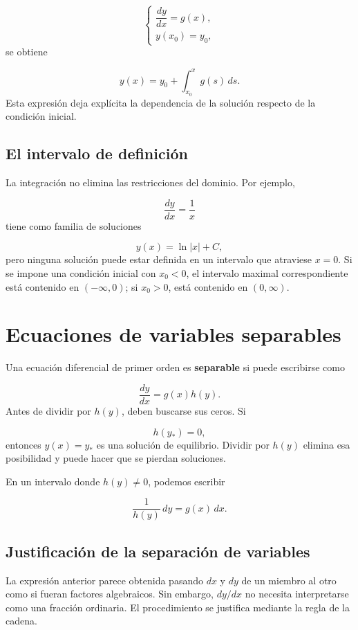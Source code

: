 \documentclass[12pt,a4paper]{article}
\begin{document}
	\[
	\begin{cases}
	\dfrac{dy}{dx}=g(x),\\[2mm]
	y(x_0)=y_0,
	\end{cases}
	\]
	se obtiene

	\[
	\boxed{y(x)=y_0+\int_{x_0}^{x}g(s)\,ds.}
	\]
	Esta expresión deja explícita la dependencia de la solución respecto de la condición inicial.

	\subsection{El intervalo de definición}

	La integración no elimina las restricciones del dominio. Por ejemplo,

	\[
	\frac{dy}{dx}=\frac{1}{x}
	\]
	tiene como familia de soluciones

	\[
	y(x)=\ln|x|+C,
	\]
	pero ninguna solución puede estar definida en un intervalo que atraviese \(x=0\). Si se impone una condición inicial con \(x_0<0\), el intervalo maximal correspondiente está contenido en \(( -\infty,0 )\); si \(x_0>0\), está contenido en \((0,\infty)\).

	\clearpage
	\section{Ecuaciones de variables separables}

	Una ecuación diferencial de primer orden es \textbf{separable} si puede escribirse como

	\[
	\frac{dy}{dx}=g(x)h(y).
	\]
	Antes de dividir por \(h(y)\), deben buscarse sus ceros. Si

	\[
	h(y_\ast)=0,
	\]
	entonces \(y(x)=y_\ast\) es una solución de equilibrio. Dividir por \(h(y)\) elimina esa posibilidad y puede hacer que se pierdan soluciones.

	En un intervalo donde \(h(y)\neq0\), podemos escribir

	\[
	\frac{1}{h(y)}\,dy=g(x)\,dx.
	\]

	\subsection{Justificación de la separación de variables}

	La expresión anterior parece obtenida pasando \(dx\) y \(dy\) de un miembro al otro como si fueran factores algebraicos. Sin embargo, \(dy/dx\) no necesita interpretarse como una fracción ordinaria. El procedimiento se justifica mediante la regla de la cadena.
\end{document}
